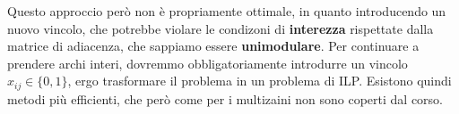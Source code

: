\documentclass[a4paper,11pt]{article}
\begin{document}
Questo approccio però non è propriamente ottimale, in quanto introducendo un nuovo vincolo, che potrebbe violare le condizoni di \textbf{interezza} rispettate dalla matrice di adiacenza, che sappiamo essere \textbf{unimodulare}.
Per continuare a prendere archi interi, dovremmo obbligatoriamente introdurre un vincolo $x_{ij} \in \{0, 1\}$, ergo trasformare il problema in un problema di ILP.
Esistono quindi metodi più efficienti, che però come per i multizaini non sono coperti dal corso.
\end{document}
